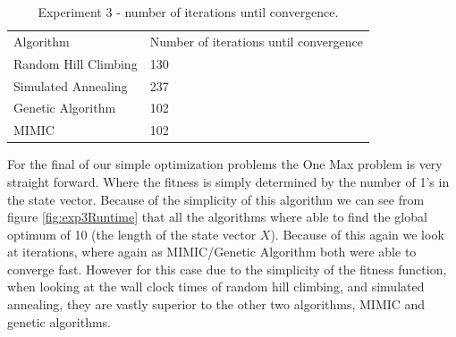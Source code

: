 \documentclass[
letterpaper, %
]{IEEEtran}
\begin{document}
	\begin{center}
		\begin{table}
			\begin{tabular}{ll}
				Algorithm            & Number of iterations until convergence \\
				Random Hill Climbing & 130                                    \\
				Simulated Annealing  & 237                                    \\
				Genetic Algorithm    & 102                                   \\
				MIMIC                & 102                                  
			\end{tabular}
			\caption{Experiment 3 - number of iterations until convergence.}
			\label{table:exp3data}
		\end{table}
	\end{center}

	For the final of our simple optimization problems the One Max problem is very straight forward. Where the fitness is simply determined by the number of 1's in the state vector. Because of the simplicity of this algorithm we can see from figure \ref{fig:exp3Runtime} that all the algorithms where able to find the global optimum of 10 (the length of the state vector $X$). Because of this again we look at iterations, where again as MIMIC/Genetic Algorithm both were able to converge fast. However for this case due to the simplicity of the fitness function, when looking at the wall clock times of random hill climbing, and simulated annealing, they are vastly superior to the other two algorithms, MIMIC and genetic algorithms.
\end{document}

